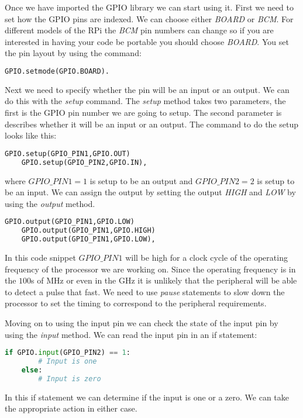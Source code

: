 Once we have imported the \ac{GPIO} library we can start using it. First we need to set how the \ac{GPIO} pins are indexed. We can choose either \emph{BOARD} or \emph{BCM}. For different models of the \ac{RPi} the \emph{BCM} pin numbers can change so if you are interested in having your code be portable you should choose \emph{BOARD}. You set the pin layout by using the command:

\begin{lstlisting}[language=python]
    GPIO.setmode(GPIO.BOARD).
\end{lstlisting}

Next we need to specify whether the pin will be an input or an output. We can do this with the \emph{setup} command. The \emph{setup} method takes two parameters, the first is the \ac{GPIO} pin number we are going to setup. The second parameter is describes whether it will be an input or an output. The command to do the setup looks like this:

\begin{lstlisting}[language=python]
    GPIO.setup(GPIO_PIN1,GPIO.OUT)
    GPIO.setup(GPIO_PIN2,GPIO.IN),
\end{lstlisting}

where $GPIO\_PIN1=1$ is setup to be an output and $GPIO\_PIN2=2$ is setup to be an input. We can assign the output by setting the output \emph{HIGH} and \emph{LOW} by using the \emph{output} method. 

\begin{lstlisting}[language=python]
    GPIO.output(GPIO_PIN1,GPIO.LOW)
    GPIO.output(GPIO_PIN1,GPIO.HIGH)
    GPIO.output(GPIO_PIN1,GPIO.LOW),
\end{lstlisting}

In this code snippet $GPIO\_PIN1$ will be high for a clock cycle of the operating frequency of the processor we are working on. Since the operating frequency is in the $100$s of \ac{MHz} or even in the \ac{GHz} it is unlikely that the peripheral will be able to detect a pulse that fast. We need to use \emph{pause} statements to slow down the processor to set the timing to correspond to the peripheral requirements. 

Moving on to using the input pin we can check the state of the input pin by using the \emph{input} method. We can read the input pin in an if statement:

\begin{lstlisting}[language=python]
    if GPIO.input(GPIO_PIN2) == 1:
        # Input is one
    else:
        # Input is zero
\end{lstlisting}

In this if statement we can determine if the input is one or a zero. We can take the appropriate action in either case. 
